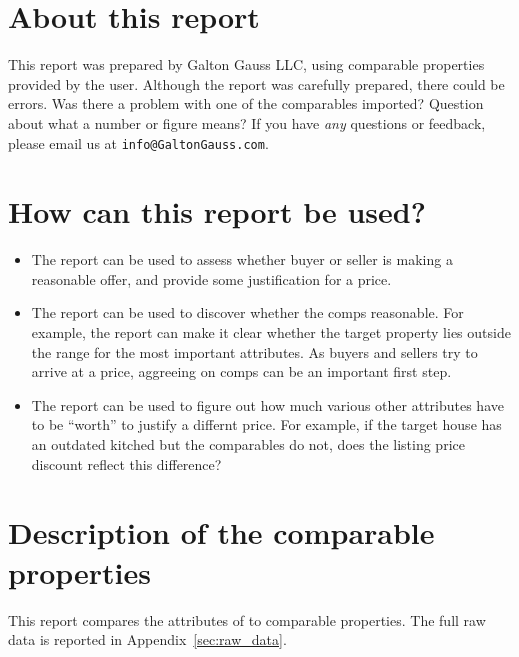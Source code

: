 \documentclass[
10pt, %
a4paper, %
oneside, %
headinclude,footinclude, %
BCOR5mm, %
]{scrartcl}
\begin{document}

\section{About this report}
This report was prepared by Galton Gauss LLC, using comparable properties provided by the user.
Although the report was carefully prepared, there could be errors.
Was there a problem with one of the comparables imported?
Question about what a number or figure means?
If you have \emph{any} questions or feedback, please email us at \texttt{info@GaltonGauss.com}.


\section{How can this report be used?}
\begin{itemize}
\item The report can be used to assess whether buyer or seller is making a reasonable offer, and provide some justification for a price. 
\item The report can be used to discover whether the comps reasonable. For example, the report can make it clear whether the target property lies outside the range for the most important attributes. As buyers and sellers try to arrive at a price, aggreeing on comps can be an important first step. 
\item The report can be used to figure out how much various other attributes have to be ``worth'' to justify a differnt price. For example, if the target house has an outdated kitched but the comparables do not, does the listing price discount reflect this difference? 
\end{itemize} 

\section{Description of the comparable properties}
This report compares the attributes of \PropertyName{} to \NumberOfComps{} comparable properties.
The full raw data is reported in Appendix~\ref{sec:raw_data}. 
\end{document}
